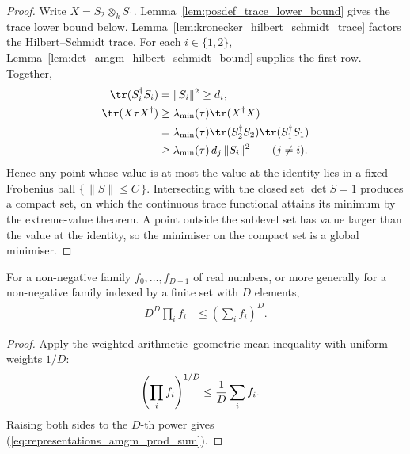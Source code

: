 \begin{proof}\leanok
    Write $X=S_{2}\otimes_{k}S_{1}$.
    Lemma~\ref{lem:posdef_trace_lower_bound} gives the trace lower bound below.
    Lemma~\ref{lem:kronecker_hilbert_schmidt_trace} factors the
    Hilbert--Schmidt trace. For each $i\in\{1,2\}$,
    Lemma~\ref{lem:det_amgm_hilbert_schmidt_bound} supplies the first row.
    Together,
    \begin{align}
        \tr(S_i^\dagger S_i)
        &=\|S_i\|^2\geq d_i,
        \notag\\
        \tr(X\tau X^\dagger)
        &\geq\lambda_{\min}(\tau)\tr(X^\dagger X)
        \notag\\
        &=\lambda_{\min}(\tau)
          \tr(S_2^\dagger S_2)\tr(S_1^\dagger S_1)
        \notag\\
        &\geq\lambda_{\min}(\tau)\,d_j\,\|S_i\|^2
          \qquad (j\neq i).
        \notag
    \end{align}
    Hence any point
    whose value is at most the value at the identity lies in a fixed
    Frobenius ball $\{\,\|S\|\leq C\,\}$. Intersecting with the closed set
    $\det S=1$ produces a compact set, on which the continuous trace
    functional attains its minimum by the extreme-value theorem. A point
    outside the sublevel set has value larger than the value at the identity,
    so the minimiser on the compact set is a global minimiser.
\end{proof}

\begin{lemma}
\label{lem:amgm_prod_sum}
    \leanok
    For a non-negative family $f_{0},\ldots,f_{D-1}$ of real numbers, or more
    generally for a non-negative family indexed by a finite set with $D$
    elements,
    \begin{align}
        D^{D}\prod_{i}f_{i}
        &\leq\left(\sum_{i}f_{i}\right)^{D}.
        \label{eq:representations_amgm_prod_sum}
    \end{align}
\end{lemma}

\begin{proof}\leanok
    Apply the weighted arithmetic--geometric-mean inequality with uniform
    weights $1/D$:
    \begin{align}
        \left(\prod_{i}f_{i}\right)^{1/D}
        &\leq\frac{1}{D}\sum_{i}f_{i}.
        \notag
    \end{align}
    Raising both sides to the $D$-th power gives
    (\ref{eq:representations_amgm_prod_sum}).
\end{proof}

